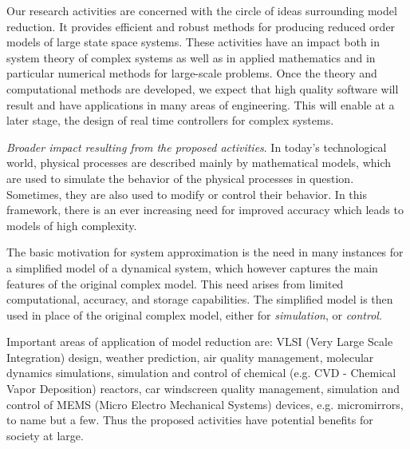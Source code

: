 Our research activities are concerned with the circle of ideas surrounding
model reduction. It provides efficient
and robust methods for producing reduced order models of
large state space systems.  These activities
have an impact both in system theory of complex systems
as well as in applied mathematics and in particular numerical methods for
large-scale problems.  Once the theory and computational
methods are developed, we expect that high quality software will result and
have applications in many areas of engineering.
This will enable at a later stage,
the design of real time controllers for complex systems.

{\it Broader impact resulting from the proposed activities}.
In today's technological world, physical processes are
described mainly by mathematical models, which are used to
simulate the behavior of the physical processes in question.
Sometimes, they are also used to modify or control their behavior.
In this framework, there is an ever increasing need for
improved accuracy which leads to models of high complexity.

The basic motivation for system approximation is the need in many
instances for a simplified model of a dynamical system, which
however captures the main features of the original complex model.
This need arises from limited computational, accuracy, and storage
capabilities. The simplified model is then used in place of the
original complex model, either for {\it simulation}, or {\it control}.

Important areas of application of model reduction are: VLSI
(Very Large Scale Integration) design, weather prediction,
air quality management, molecular dynamics simulations, simulation and
control of chemical (e.g. CVD - Chemical Vapor Deposition) reactors,
car windscreen quality management, simulation and control of MEMS (Micro
Electro Mechanical Systems) devices, e.g. micromirrors, to name but a few.
Thus the proposed activities have potential benefits for society at large.



